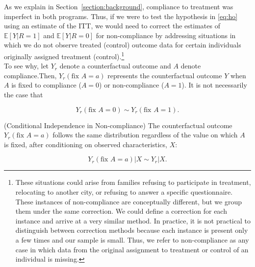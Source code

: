 \noindent As we explain in Section~\ref{section:background}, compliance to treatment was imperfect in both programs. Thus, if we were to test the hypothesis in \eqref{eq:ho} using an estimate of the ITT, we would need to correct the estimates of $\mathbb{E} \left[ Y | R = 1 \right]$ and $\mathbb{E} \left[ Y | R = 0 \right]$ for non-compliance by addressing situations in which we do not observe treated (control) outcome data for certain individuals originally assigned treatment (control).\footnote{These situations could arise from families refusing to participate in treatment, relocating to another city, or refusing to answer a specific questionnaire. These instances of non-compliance are conceptually different, but we group them under the same correction. We could define a correction for each instance and arrive at a very similar method. In practice, it is not practical to distinguish between correction methods because each instance is present only a few times and our sample is small. Thus, we refer to non-compliance as any case in which data from the original assignment to treatment or control of an individual is missing.} \\

\noindent To see why, let $Y_r$ denote a counterfactual outcome and $A$ denote compliance.Then, $Y_{r} \left(\text{fix } A = a \right)$ represents the counterfactual outcome $Y$ when $A$ is fixed to compliance ($A = 0$) or non-compliance ($A = 1$). It is not necessarily the case that 

\begin{equation}
Y_{r} \left(\text{fix } A = 0 \right) \sim Y_{r} \left(\text{fix } A = 1 \right). 
\end{equation}

\begin{assumption} \normalfont \label{assumption:balance} (Conditional Independence in Non-compliance) The counterfactual outcome $Y_{r} \left(\text{fix } A = a \right)$ follows the same distribution regardless of the value on which $A$ is fixed, after conditioning on observed characteristics, $X$: 

\begin{equation}
Y_{r} \left(\text{fix } A = a \right) | X \sim Y_{r} | X. 
\end{equation}

\end{assumption}

